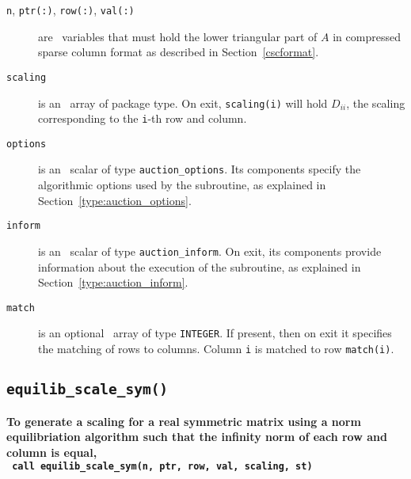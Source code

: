 \begin{description}

\item[\texttt{n}, \texttt{ptr(:)}, \texttt{row(:)}, \texttt{val(:)}] are \intentin\ variables that must hold the lower triangular part of $A$ in compressed sparse column format as described in Section~\ref{cscformat}.

\item[\texttt{scaling}] is an \intentout\ array of package type. On exit,
\texttt{scaling(i)} will hold $D_{ii}$, the scaling corresponding to the
\texttt{i}-th row and column.

\item[\texttt{options}] is an \intentin\ scalar of type \texttt{auction\_options}. Its components specify the algorithmic options used by the subroutine, as explained in Section~\ref{type:auction_options}.

\item[\texttt{inform}] is an \intentout\ scalar of type \texttt{auction\_inform}. On exit, its components provide information about the execution of the subroutine, as explained in Section~\ref{type:auction_inform}.

\item[\texttt{match}] is an optional \intentout\ array of type {\tt INTEGER}.
If present, then on exit it specifies the matching of rows to columns.
Column \texttt{i} is matched to row \texttt{match(i)}.

\end{description}


\subsection{\texttt{equilib\_scale\_sym()}}

\textbf{\noindent
   To generate a scaling for a real symmetric matrix using a norm equilibriation algorithm such that the infinity norm of each row and column is equal,
   \vspace*{0.1cm} \\
   \texttt{ \hspace*{0.2cm}
      call equilib\_scale\_sym(n, ptr, row, val, scaling, st)
   }
   \vspace{0.3cm}
}


